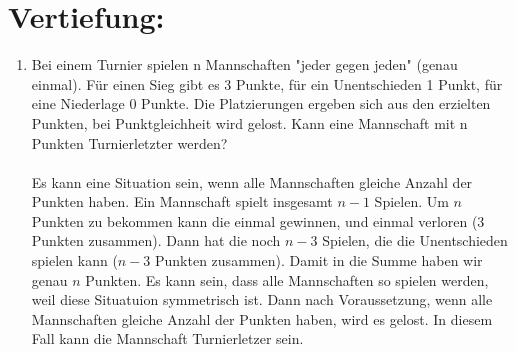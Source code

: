 


\DeclareMathOperator{\ggT}{ggT}
\DeclareMathOperator{\kgV}{kgV}


    \maketitle
    \section*{Vertiefung:}
    \begin{enumerate}[label=(\alph*)]
        \item Bei einem Turnier spielen n Mannschaften "jeder gegen jeden" (genau einmal). Für einen
		Sieg gibt es 3 Punkte, für ein Unentschieden 1 Punkt, für eine Niederlage 0 Punkte. Die
		Platzierungen ergeben sich aus den erzielten Punkten, bei Punktgleichheit wird gelost.
		Kann eine Mannschaft mit n Punkten Turnierletzter werden? \\\\
		Es kann eine Situation sein, wenn alle Mannschaften gleiche Anzahl der Punkten haben. 
		Ein Mannschaft spielt insgesamt $n-1$ Spielen. Um $n$ Punkten zu bekommen kann die einmal 
		gewinnen, und einmal verloren (3 Punkten zusammen). Dann hat die noch $n-3$ Spielen, die die 
		Unentschieden spielen kann ($n-3$ Punkten zusammen). Damit in die Summe haben wir genau $n$ 
		Punkten. Es kann sein, dass alle Mannschaften so spielen werden, weil diese Situatuion
		symmetrisch ist. Dann nach Voraussetzung, wenn alle Mannschaften gleiche Anzahl der Punkten 
		haben, wird es gelost. In diesem Fall kann die Mannschaft Turnierletzer sein.
		

\end{enumerate}

